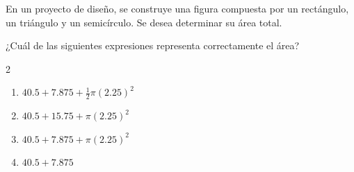 En un proyecto de diseño, se construye una figura compuesta por un rectángulo, un triángulo y un semicírculo. Se desea determinar su área total.

¿Cuál de las siguientes expresiones representa correctamente el área?

\begin{multicols}{2}
\begin{enumerate}[label=\alph*), leftmargin=*]
\item $40.5 + 7.875 + \frac{1}{2}\pi(2.25)^2$
\item $40.5 + 15.75 + \pi(2.25)^2$
\item $40.5 + 7.875 + \pi(2.25)^2$
\item $40.5 + 7.875$
\end{enumerate}
\end{multicols}